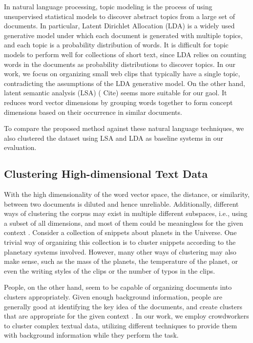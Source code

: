 In natural language processing, topic modeling is the process of using
unsupervised statistical models to discover abstract topics from a large set of
documents. In particular, Latent Dirichlet Allocation (LDA)
\cite{blei2003latent} is a widely used generative model under which each
document is generated with multiple topics, and each topic is a probability
distribution of words.  It is difficult for topic models to perform well for
collections of short text, since LDA relies on counting words in the documents
as probability distributions to discover topics.  In our work, we focus on
organizing small web clips that typically have a single topic, contradicting
the assumptions of the LDA generative model. On the other hand, latent semantic
analysis (LSA) ( Cite) seems more suitable for our gaol. It reduces word vector
dimensions by grouping words together to form concept dimensions based on their
occurrence in similar documents.

To compare the proposed method against these natural language techniques, we
also clustered the dataset using LSA and LDA as baseline systems in our
evaluation.

\subsection{Clustering High-dimensional Text Data}

With the high dimensionality of the word vector space, the distance, or
similarity, between two documents is diluted and hence unreliable. Additionally,
different ways of clustering the corpus may exist in multiple different
subspaces, i.e., using a subset of all dimensions, and most of them could be meaningless for the given context %
\cite{kriegel2009clustering}. Consider a collection of snippets about planets in
the Universe.  One trivial way of organizing this collection is to cluster
snippets according to the planetary systems involved.  However, many other ways
of clustering may also make sense, such as the mass of the planets, the
temperature of the planet, or even the writing styles of the clips or the
number of typos in the clips.

People, on the other hand, seem to be capable of organizing documents into
clusters appropriately.  Given enough background information, people are
generally good at identifying the key idea of the documents, and create
clusters that are appropriate for the given context \cite{medin1978context}. In
our work, we employ crowdworkers to cluster
complex textual data, utilizing different techniques to provide them with background
information while they perform the task. 

